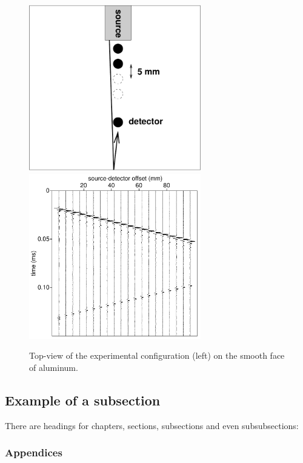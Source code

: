 \begin{figure}
  \center
  \includegraphics[width=7.5cm]{figures/setup}
  \includegraphics[width=7.5cm]{figures/exp0}
  \caption{Top-view of the experimental configuration (left) on the
    smooth face of aluminum.}
  \label{fig:figure}
\end{figure}

\subsection{Example of a subsection}

There are headings for chapters, sections, subsections and even
subsubsections:

\subsubsection{Appendices}

